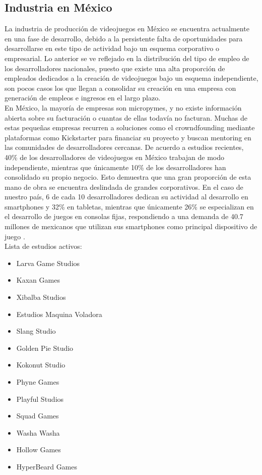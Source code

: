 \subsection{Industria en México}
La industria de producción de videojuegos en México se encuentra actualmente en una fase de desarrollo, debido a la persistente falta de oportunidades para desarrollarse en este tipo de actividad bajo un esquema corporativo o empresarial. Lo anterior se ve reflejado en la distribución del tipo de empleo de los desarrolladores nacionales, puesto que existe una alta proporción de empleados dedicados a la creación de videojuegos bajo un esquema independiente, son pocos casos los que llegan a consolidar su creación en una empresa con generación de empleos e ingresos en el largo plazo.
\\[1pt]

En México, la mayoría de empresas son micropymes, y no existe información abierta sobre su facturación o cuantas de ellas todavía no facturan. Muchas de estas pequeñas empresas recurren a soluciones como el crowndfounding mediante plataformas como Kickstarter para financiar su proyecto y buscan mentoring en las comunidades de desarrolladores cercanas\cite{vid05}. De acuerdo a estudios recientes, 40\% de los desarrolladores de videojuegos en México trabajan de modo independiente, mientras que únicamente 10\% de los desarrolladores han consolidado su propio negocio. Esto demuestra que una gran proporción de esta mano de obra se encuentra deslindada de grandes corporativos. En el caso de nuestro país, 6 de cada 10 desarrolladores dedican su actividad al desarrollo en smartphones y 32\% en tabletas, mientras que únicamente 26\% se especializan en el desarrollo de juegos en consolas fijas, respondiendo a una demanda de 40.7 millones de mexicanos que utilizan sus smartphones como principal dispositivo de juego \cite{vid04}.
\\[1pt]

Lista de estudios activos:
\begin{itemize}
	\item Larva Game Studios
	\item Kaxan Games
	\item Xibalba Studios
	\item Estudios Maquina Voladora
	\item Slang Studio
	\item Golden Pie Studio
	\item Kokonut Studio
	\item Phyne Games
	\item Playful Studios
	\item Squad Games
	\item Washa Washa
	\item Hollow Games
	\item HyperBeard Games
	
\end{itemize}
